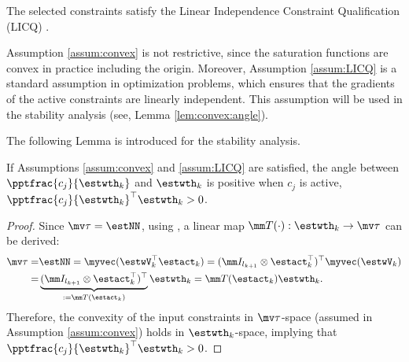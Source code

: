\documentclass[lettersize,journal]{IEEEtran}
\begin{document}
\begin{assum}
    The selected constraints satisfy the Linear Independence Constraint Qualification (LICQ) \cite[Chap.~12 Def.~12.1]{Nocedal:2006aa}.
    \label{assum:LICQ}
\end{assum}

\begin{remark}
    Assumption \ref{assum:convex} is not restrictive, since the saturation functions are convex in practice including the origin.
    Moreover, Assumption \ref{assum:LICQ} is a standard assumption in optimization problems, which ensures that the gradients of the active constraints are linearly independent.
    This assumption will be used in the stability analysis (see, Lemma \ref{lem:convex:angle}).
\end{remark}

The following Lemma is introduced for the stability analysis.
\begin{lem}
    If Assumptions \ref{assum:convex} and \ref{assum:LICQ} are satisfied, the angle between $\pptfrac{c_j}{\estwth_k}$ and $\estwth_k$ is positive when $c_j$ is active, \ie $\pptfrac{c_j}{\estwth_k}^\top\estwth_k>0$.
    \label{lem:convex:angle}
\end{lem}

\begin{proof}

Since $\mv\tau = \estNN$, using \cite[Proposition 7.1.9]{Bernstein:2009aa}, a linear map $\mm T(\cdot):\estwth_k\to\mv\tau$ can be derived: 
\begin{equation}\label{eq:linear:map}
    \begin{aligned}
    \mv\tau 
    = 
    &
    \estNN 
    =
    \myvec(
        \estwV_k^\top \estact_k
    ) 
    = 
    (
        \mm I_{l_{k+1}}
        \otimes 
        \estact_k^\top
    )^\top
    \myvec(\estwV_k)
    \\
    = &
    \underbrace{
        (
        \mm I_{l_{k+1}}
        \otimes 
        \estact_k^\top
    )^\top}_{:=\mm T(\estact_k)}
    \estwth_k 
    =
    \mm T(\estact_k) \estwth_k.
    \end{aligned}
\end{equation}
Therefore, the convexity of the input constraints in $\mv\tau$-space (assumed in Assumption \ref{assum:convex}) holds in $\estwth_k$-space, implying
that $\pptfrac{c_j}{\estwth_k}^\top\estwth_k>0$.

\end{proof}
\end{document}
